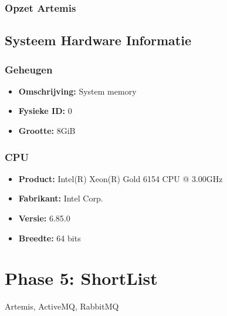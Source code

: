   \subsubsection{Opzet Artemis}
  
  \subsection{Systeem Hardware Informatie}
  \subsubsection*{Geheugen}
  \begin{itemize}
      \item \textbf{Omschrijving:} System memory
      \item \textbf{Fysieke ID:} 0
      \item \textbf{Grootte:} 8GiB
  \end{itemize}
  
  \subsubsection*{CPU}
  \begin{itemize}
      \item \textbf{Product:} Intel(R) Xeon(R) Gold 6154 CPU @ 3.00GHz
      \item \textbf{Fabrikant:} Intel Corp. 
      \item \textbf{Versie:} 6.85.0
      \item \textbf{Breedte:} 64 bits
  \end{itemize}


\section{Phase 5: ShortList}

Artemis, ActiveMQ, RabbitMQ




 




